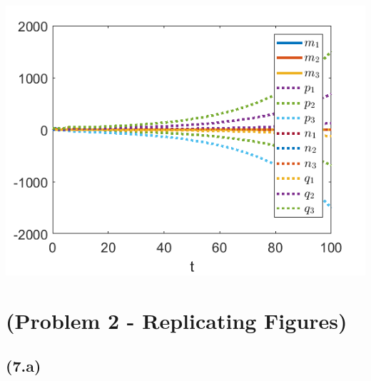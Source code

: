 \documentclass{article}
\begin{document}
\begin{center}
        \includegraphics[scale = .5]{crash.png}
\end{center}
\section*{\textbf{(Problem 2 - Replicating Figures)}}
\subsection*{\textbf{(7.a)}}
\end{document}
